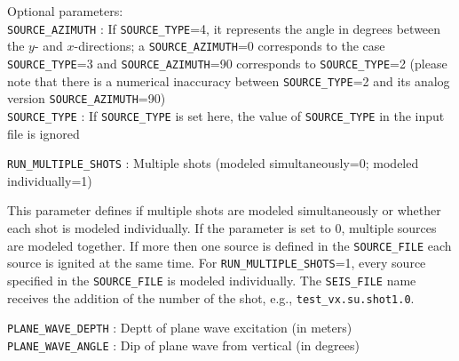 Optional parameters:\\
\texttt{SOURCE\_AZIMUTH} : If \texttt{SOURCE\_TYPE}=4, it represents the angle in degrees between the $y$- and $x$-directions; a \texttt{SOURCE\_AZIMUTH}=0 corresponds to the case \texttt{SOURCE\_TYPE}=3 and \texttt{SOURCE\_AZIMUTH}=90 corresponds to \texttt{SOURCE\_TYPE}=2 (please note that there is a numerical inaccuracy between \texttt{SOURCE\_TYPE}=2 and its analog version \texttt{SOURCE\_AZIMUTH}=90)\\
\texttt{SOURCE\_TYPE} : If \texttt{SOURCE\_TYPE} is set here, the value of \texttt{SOURCE\_TYPE} in the input file is ignored

\texttt{RUN\_MULTIPLE\_SHOTS} : Multiple shots (modeled simultaneously=0; modeled individually=1)

This parameter defines if multiple shots are modeled simultaneously or whether each shot is modeled individually. If the parameter is set to 0, multiple sources are modeled together. If more then one source is defined in the \texttt{SOURCE\_FILE} each source is ignited at the same time. For \texttt{RUN\_MULTIPLE\_SHOTS}=1, every source specified in the \texttt{SOURCE\_FILE} is modeled individually. The \texttt{SEIS\_FILE} name receives the addition of the number of the shot, e.g., \texttt{test\_vx.su.shot1.0}.

\texttt{PLANE\_WAVE\_DEPTH} : Deptt of plane wave excitation (in meters)\\
\texttt{PLANE\_WAVE\_ANGLE} : Dip of plane wave from vertical (in degrees)

